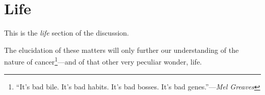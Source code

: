 \section{Life}
\label{life-discussion}

This is the \emph{life} section of the discussion.

The elucidation of these matters will only further our understanding of the
nature of cancer\footnote{``It's bad bile.  It's bad habits.  It's bad bosses.
  It's bad genes.''---\emph{Mel Greaves}}---and of that other very peculiar
wonder, life.

\clearpage

